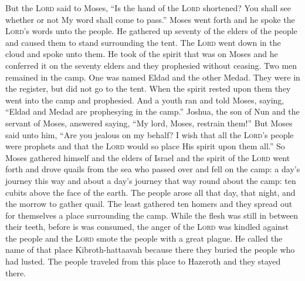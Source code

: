 \begin{inparaenum}
   But the \textsc{Lord} said to Moses, ``Is the hand of the \textsc{Lord} shortened? You shall see whether or not My word shall come to pass.''%
   Moses went forth and he spoke the \textsc{Lord}'s words unto the people. He gathered up seventy of the elders of the people and caused them to stand surrounding the tent.%
   The \textsc{Lord} went down in the cloud and spoke unto them. He took of the spirit that was on Moses and he conferred it on the seventy elders and they prophesied without ceasing.%
   Two men remained in the camp. One was named Eldad and the other Medad. They were in the register, but did not go to the tent. When the spirit rested upon them they went into the camp and prophesied.%
   And a youth ran and told Moses, saying, ``Eldad and Medad are prophesying in the camp.''%
   Joshua, the son of Nun and the servant of Moses, answered saying, ``My lord, Moses, restrain them!''%
   But Moses said unto him, ``Are you jealous on my behalf? I wish that all the \textsc{Lord}'s people were prophets and that the \textsc{Lord} would so place His spirit upon them all.''%
   So Moses gathered himself and the elders of Israel%
   and the spirit of the \textsc{Lord} went forth and drove quails from the sea who passed over and fell on the camp: a day's journey this way and about a day's journey that way round about the camp: ten cubits above the face of the earth.%
   The people arose all that day, that night, and the morrow to gather quail. The least gathered ten homers and they spread out for themselves a place surrounding the camp.%
   While the flesh was still in between their teeth, before is was consumed, the anger of the \textsc{Lord} was kindled against the people and the \textsc{Lord} smote the people with a great plague.%
   He called the name of that place Kibroth-hattaavah because there they buried the people who had lusted.%
   The people traveled from this place to Hazeroth and they stayed there.%
\end{inparaenum}
